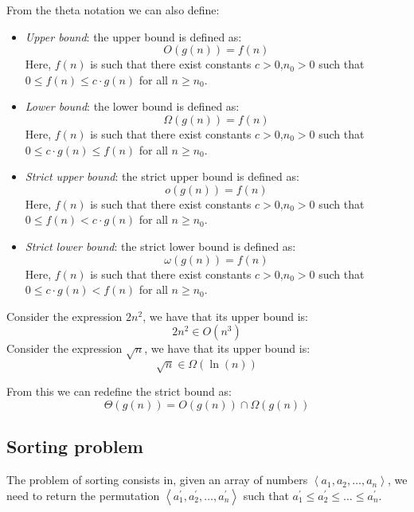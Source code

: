 From the theta notation we can also define: 
\begin{itemize}
    \item \textit{Upper bound}: the upper bound is defined as: 
        \[O(g(n))=f(n)\]
        Here, $f(n)$ is such that there exist constants $c > 0$,$ n_0 > 0$ such that $0 \leq f(n) \leq c \cdot g(n)$ for all $n \geq n_0$. 
    \item \textit{Lower bound}: the lower bound is defined as: 
        \[\Omega(g(n))=f(n)\]
        Here, $f(n)$ is such that there exist constants $c > 0$,$ n_0 > 0$ such that $0 \leq c \cdot g(n) \leq f(n)$ for all $n \geq n_0$. 
    \item \textit{Strict upper bound}: the strict upper bound is defined as: 
        \[o(g(n))=f(n)\]
        Here, $f(n)$ is such that there exist constants $c > 0$,$ n_0 > 0$ such that $0 \leq f(n) < c \cdot g(n)$ for all $n \geq n_0$. 
    \item \textit{Strict lower bound}: the strict lower bound is defined as: 
        \[\omega(g(n))=f(n)\]
        Here, $f(n)$ is such that there exist constants $c > 0$,$ n_0 > 0$ such that $0 \leq c \cdot g(n) < f(n)$ for all $n \geq n_0$. 
\end{itemize}
\begin{example}
    Consider the expression $2n^2$, we have that its upper bound is: 
    \[2n^2 \in O(n^3)\]
    Consider the expression $\sqrt{n}$, we have that its upper bound is: 
    \[\sqrt{n} \in \Omega(\ln(n))\]
\end{example}
From this we can redefine the strict bound as: 
\[\Theta(g(n))=O(g(n))\cap\Omega(g(n))\]

\subsection{Sorting problem}
The problem of sorting consists in, given an array of numbers $\left\langle a_1,a_2,\dots,a_n \right\rangle$, we need to return the permutation $\left\langle a_1^\prime,a_2^\prime,\dots,a_n^\prime \right\rangle$ such that $a_1^\prime\leq a_2^\prime \leq \dots \leq a_n^\prime$. 

